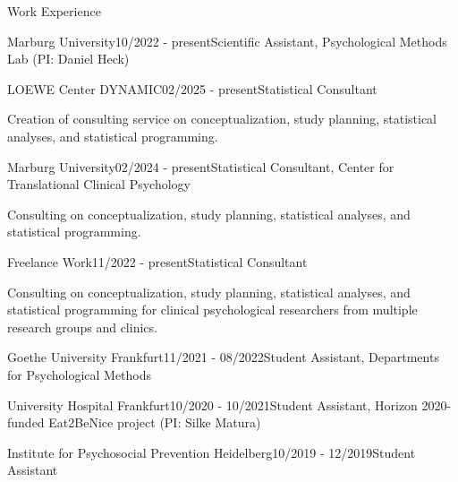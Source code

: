 \documentclass{resume} %
\begin{document}
\begin{rSection}{Work Experience}



\begin{rSubsection}{Marburg University}{10/2022 - present}{Scientific Assistant, Psychological Methods Lab (PI: Daniel Heck)}

\end{rSubsection}

\begin{rSubsection}{LOEWE Center DYNAMIC}{02/2025 - present}{Statistical Consultant}
\item 
\item[] Creation of consulting service on conceptualization, study planning, statistical analyses, and statistical programming. 
\end{rSubsection}

\begin{rSubsection}{Marburg University}{02/2024 - present}{Statistical Consultant, Center for Translational Clinical Psychology}
\item 
\item[] Consulting on conceptualization, study planning, statistical analyses, and statistical programming. 
\end{rSubsection}

\begin{rSubsection}{Freelance Work}{11/2022 - present}{Statistical Consultant}
\item
\item[] Consulting on conceptualization, study planning, statistical analyses, and statistical programming for clinical psychological researchers from multiple research groups and clinics. 
\end{rSubsection}



\begin{rSubsection}{Goethe University Frankfurt}{11/2021 - 08/2022}{Student Assistant, Departments for Psychological Methods}

\end{rSubsection}

\begin{rSubsection}{University Hospital Frankfurt}{10/2020 - 10/2021}{Student Assistant, Horizon 2020-funded Eat2BeNice project (PI: Silke Matura)}

\end{rSubsection}

\begin{rSubsection}{Institute for Psychosocial Prevention Heidelberg}{10/2019 - 12/2019}{Student Assistant}

\end{rSubsection}

\end{rSection}
\end{document}
